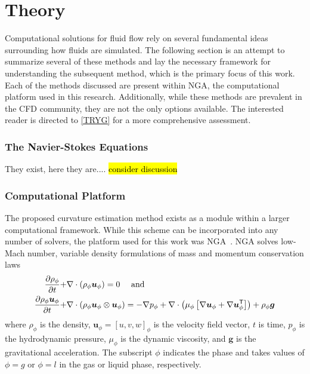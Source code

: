\chapter{Theory} \label{CH:theory}
Computational solutions for fluid flow rely on several fundamental ideas surrounding how fluids are simulated. The following section is an attempt to summarize several of these methods and lay the necessary framework for understanding the subsequent method, which is the primary focus of this work. Each of the methods discussed are present within NGA, the computational platform used in this research. Additionally, while these methods are prevalent in the CFD community, they are not the only options available. The interested reader is directed to \ref{TRYG} for a more comprehensive assessment.   

\subsection{The Navier-Stokes Equations}
They exist, here they are....
\hl{consider discussion}

\subsection{Computational Platform}
The proposed curvature estimation method exists as a module within a larger computational framework. While this scheme can be incorporated into any number of solvers, the platform used for this work was NGA~\cite{NGA1,NGA2}.  NGA solves low-Mach number, variable density formulations of mass and momentum conservation laws
\begin{align}
\frac{\partial \rho_\phi}{\partial t} +& \nabla \cdot \left(\rho_\phi\mbox{\boldmath{$u$}}_\phi\right) = 0\mbox{ \quad and}\\
\frac{\partial \rho_\phi \mbox{\boldmath{$u$}}_\phi}{\partial t} +& \nabla \cdot \left(\rho_\phi\mbox{\boldmath{$u$}}_\phi\otimes\mbox{\boldmath{$u$}}_\phi\right) = -\nabla p_\phi + \nabla\cdot\left(\mu_\phi\left[\nabla\mbox{\boldmath{$u$}}_\phi+\nabla\mbox{\boldmath{$u$}}_\phi^\mathsf{T}\right]\right)+\rho_\phi\mbox{\boldmath{$g$}}
\end{align}
where
$\rho_\phi$ is the density,
$\bm{u}_\phi=[u,v,w]_\phi$ is the velocity field vector,
$t$ is time,
$p_\phi$ is the hydrodynamic pressure,
$\mu_\phi$ is the dynamic viscosity, and
$\bm{g}$ is the gravitational acceleration.
The subscript
$\phi$ indicates the phase and takes values of $\phi=g$ or
$\phi=l$ in the gas or liquid phase, respectively.


